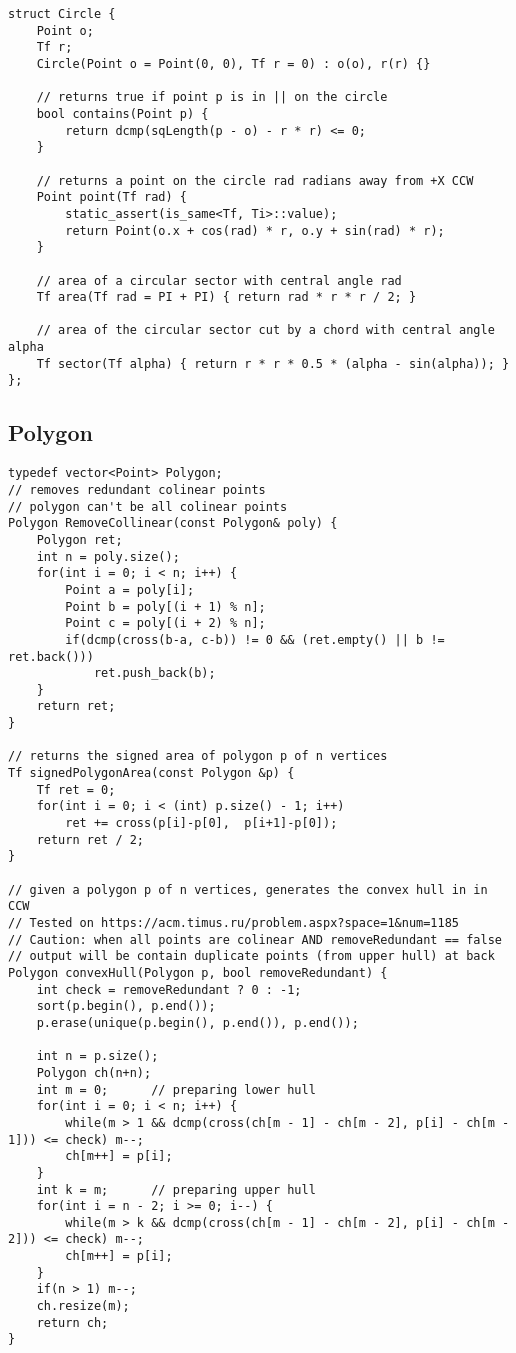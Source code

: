 \documentclass[FSZ,a4paper,onesided]{article}
\begin{document}
\begin{multicols*}{\COLS}
\begin{lstlisting}
struct Circle {
    Point o;
    Tf r;
    Circle(Point o = Point(0, 0), Tf r = 0) : o(o), r(r) {}
 
    // returns true if point p is in || on the circle
    bool contains(Point p) {
        return dcmp(sqLength(p - o) - r * r) <= 0;
    }
 
    // returns a point on the circle rad radians away from +X CCW
    Point point(Tf rad) {
        static_assert(is_same<Tf, Ti>::value);
        return Point(o.x + cos(rad) * r, o.y + sin(rad) * r);
    }
 
    // area of a circular sector with central angle rad
    Tf area(Tf rad = PI + PI) { return rad * r * r / 2; }
 
    // area of the circular sector cut by a chord with central angle alpha
    Tf sector(Tf alpha) { return r * r * 0.5 * (alpha - sin(alpha)); }
};\end{lstlisting}
\subsection{Polygon}
\begin{lstlisting}
typedef vector<Point> Polygon;
// removes redundant colinear points
// polygon can't be all colinear points
Polygon RemoveCollinear(const Polygon& poly) {
    Polygon ret;
    int n = poly.size();
    for(int i = 0; i < n; i++) {
        Point a = poly[i];
        Point b = poly[(i + 1) % n];
        Point c = poly[(i + 2) % n];
        if(dcmp(cross(b-a, c-b)) != 0 && (ret.empty() || b != ret.back()))
            ret.push_back(b);
    }
    return ret;
}

// returns the signed area of polygon p of n vertices
Tf signedPolygonArea(const Polygon &p) {
    Tf ret = 0;
    for(int i = 0; i < (int) p.size() - 1; i++)
        ret += cross(p[i]-p[0],  p[i+1]-p[0]);
    return ret / 2;
}

// given a polygon p of n vertices, generates the convex hull in in CCW
// Tested on https://acm.timus.ru/problem.aspx?space=1&num=1185
// Caution: when all points are colinear AND removeRedundant == false
// output will be contain duplicate points (from upper hull) at back
Polygon convexHull(Polygon p, bool removeRedundant) {
    int check = removeRedundant ? 0 : -1;
    sort(p.begin(), p.end());
    p.erase(unique(p.begin(), p.end()), p.end());

    int n = p.size();
    Polygon ch(n+n);
    int m = 0;      // preparing lower hull
    for(int i = 0; i < n; i++) {
        while(m > 1 && dcmp(cross(ch[m - 1] - ch[m - 2], p[i] - ch[m - 1])) <= check) m--;
        ch[m++] = p[i];
    }
    int k = m;      // preparing upper hull
    for(int i = n - 2; i >= 0; i--) {
        while(m > k && dcmp(cross(ch[m - 1] - ch[m - 2], p[i] - ch[m - 2])) <= check) m--;
        ch[m++] = p[i];
    }
    if(n > 1) m--;
    ch.resize(m);
    return ch;
}


\end{lstlisting}
\end{multicols*}
\end{document}
